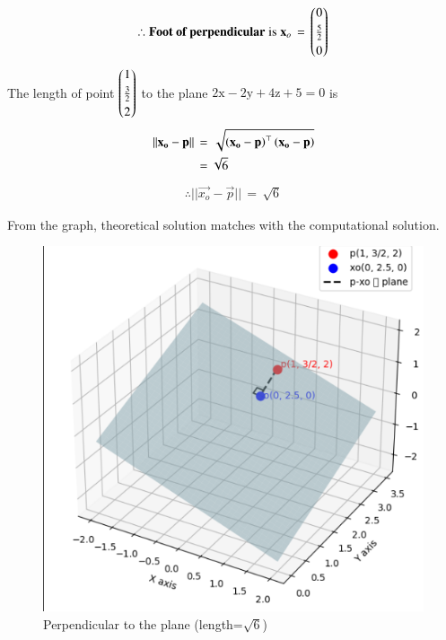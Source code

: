 \documentclass[journal,12pt,onecolumn]{IEEEtran}
\theoremstyle{remark}
\begin{document}
\begin{align*}
    \therefore \textbf{Foot of perpendicular}\; \text{is}\; \mathbf{x}_o\,=\,\begin{pmatrix}0\\[3pt]\frac{5}{2}\\[3pt]0\end{pmatrix}
    \end{align*}
\newpage
The length of point $\begin{pmatrix}1\\[3pt]\frac{3}{2}\\[3pt]2\end{pmatrix}$ to the plane $2\text{x}-2\text{y}+4\text{z}+5=0$ is
\begin{align}
    ||\mathbf{x_o}-\mathbf{p}||\,&=\,\sqrt{\left(\mathbf{x_o}-\mathbf{p}\right)^\top\left(\mathbf{x_o}-\mathbf{p}\right)}\\
    &=\sqrt{6}
\end{align}
\begin{align*}
    \therefore ||\vec{x_o}-\vec{p}||\,=\,\sqrt{6}
\end{align*}

From the graph, theoretical solution matches with the computational solution.

\begin{figure}[H]
\centering
\includegraphics[width=0.7\columnwidth]{figs/graph.png}
\caption*{Perpendicular to the plane (length=$\sqrt{6}$)}
\label{fig:graph.png}
\end{figure}
\end{document}
